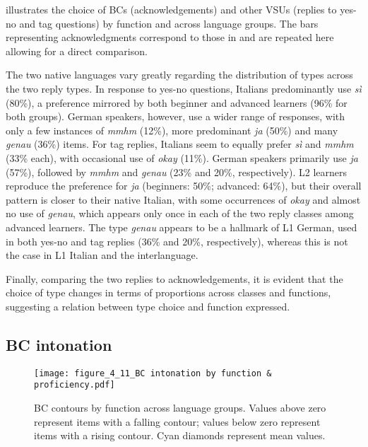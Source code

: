  illustrates the choice of BCs (acknowledgements) and other VSUs (replies to yes-no and tag questions) by function and across language groups. The bars representing acknowledgments correspond to those in  and are repeated here allowing for a direct comparison.

The two native languages vary greatly regarding the distribution of types across the two reply types. In response to yes-no questions, Italians predominantly use \textit{sì} (80\%), a preference mirrored by both beginner and advanced learners (96\% for both groups). German speakers, however, use a wider range of responses, with only a few instances of \textit{mmhm} (12\%), more predominant \textit{ja} (50\%) and many \textit{genau} (36\%) items. For tag replies, Italians seem to equally prefer \textit{sì} and \textit{mmhm} (33\% each), with occasional use of \textit{okay} (11\%). German speakers primarily use \textit{ja} (57\%), followed by \textit{mmhm} and \textit{genau} (23\% and 20\%, respectively). L2 learners reproduce the preference for \textit{ja} (beginners: 50\%; advanced: 64\%), but their overall pattern is closer to their native Italian,  with some occurrences of \textit{okay} and almost no use of \textit{genau}, which appears only once in each of the two reply classes among advanced learners. The type \textit{genau} appears to be a hallmark of L1 German, used in both yes-no and tag replies (36\% and 20\%, respectively), whereas this is not the case in L1 Italian and the interlanguage.

Finally, comparing the two replies to acknowledgements, it is evident that the choice of type changes in terms of proportions across classes and functions, suggesting a relation between type choice and function expressed.

\subsection{BC intonation}
\begin{figure}[b]
\texttt{[image: figure\_4\_11\_BC intonation by function \& proficiency.pdf]}
\caption{BC contours by function across language groups. Values above zero represent items with a falling contour; values below zero represent items with a rising contour. Cyan diamonds represent mean values.}
\label{fig:4.11}
\end{figure}

